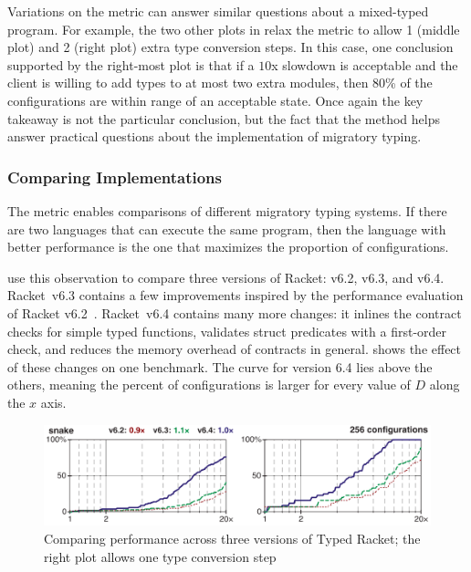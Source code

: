 Variations on the  metric can answer similar questions
 about a mixed-typed program.
For example, the two other plots in 
 relax the metric to allow 1 (middle plot) and 2 (right plot) extra type
 conversion steps.
In this case, one conclusion supported by the right-most plot is that
 if a $10$x slowdown is acceptable and the client is willing to add types
 to at most two extra modules, then 80\% of the configurations are within
 range of an acceptable state.
Once again the key takeaway is not the particular conclusion,
 but the fact that the method helps answer practical questions
 about the implementation of migratory typing.


\subsubsection{Comparing Implementations}

The  metric enables comparisons of different migratory
 typing systems.
If there are two languages that can execute the same program,
 then the language with better performance is the one that maximizes the
 proportion of  configurations.

\citet{gtnffvf-jfp-2019} use this observation to compare three versions
 of Racket: v6.2, v6.3, and v6.4.
Racket~v6.3 contains a few improvements inspired by the performance
 evaluation of Racket v6.2~\cite{tfgnvf-popl-2016}.
Racket~v6.4 contains many more changes:
 it inlines the contract checks for simple typed functions,
 validates struct predicates with a first-order check,
 and reduces the memory overhead of contracts in general.
 shows the effect of these changes on one benchmark.
The curve for version 6.4 lies above the others, meaning the percent of
  configurations is larger for every value of $D$ along
 the $x$ axis.

\begin{figure}[ht]
\includegraphics[width=0.8\columnwidth]{src/snake-jfp.png}
\caption{Comparing performance across three versions of Typed Racket; the right plot allows one type conversion step}
\label{fig:snake-jfp}
\end{figure}

